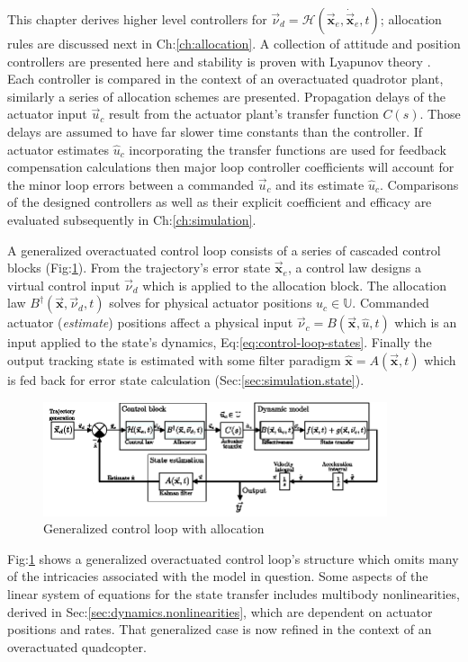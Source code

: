 This chapter derives higher level controllers for $\vec{\nu}_d=\mathcal{H}(\vec{\mathbf{x}}_e,\dot{\vec{\mathbf{x}}}_e,t)$; allocation rules are discussed next in Ch:\ref{ch:allocation}. A collection of attitude and position controllers are presented here and stability is proven with Lyapunov theory \cite{lyapunovconference}. Each controller is compared in the context of an overactuated quadrotor plant, similarly a series of allocation schemes are presented. Propagation delays of the actuator input $\vec{u}_c$ result from the actuator plant's transfer function $C(s)$. Those delays are assumed to have far slower time constants than the controller. If actuator estimates $\hat{u}_c$ incorporating the transfer functions are used for feedback compensation calculations then major loop controller coefficients will account for the minor loop errors between a commanded $\vec{u}_c$ and its estimate $\hat{u}_c$. Comparisons of the designed controllers as well as their explicit coefficient and efficacy are evaluated subsequently in Ch:\ref{ch:simulation}. 
\par
A generalized overactuated control loop consists of a series of cascaded control blocks (Fig:\ref{fig:control-loop}). From the trajectory's error state $\vec{\mathbf{x}}_e$, a control law designs a virtual control input $\vec{\nu}_d$ which is applied to the allocation block. The allocation law $B^{\dagger}(\vec{\mathbf{x}},\vec{\nu}_d,t)$ solves for physical actuator positions $u_c\in\mathbb{U}$. Commanded actuator (\emph{estimate}) positions affect a physical input $\vec{\nu}_c=B(\vec{\mathbf{x}},\hat{u},t)$ which is an input applied to the state's dynamics, Eq:\ref{eq:control-loop-states}. Finally the output tracking state is estimated with some filter paradigm $\hat{\mathbf{x}}=A(\vec{\mathbf{x}},t)$ which is fed back for error state calculation (Sec:\ref{sec:simulation.state}).
\begin{figure}[htbp]
\vspace{-6pt}
\centering
\includegraphics[width=0.9\textwidth]{figs/control-loop}
\vspace{-10pt}
\caption{Generalized control loop with allocation}
\vspace{-20pt}
\label{fig:control-loop}
\end{figure}
\par
Fig:\ref{fig:control-loop} shows a generalized overactuated control loop's structure which omits many of the intricacies associated with the model in question. Some aspects of the linear system of equations for the state transfer includes multibody nonlinearities, derived in Sec:\ref{sec:dynamics.nonlinearities}, which are dependent on actuator positions and rates. That generalized case is now refined in the context of an overactuated quadcopter.
